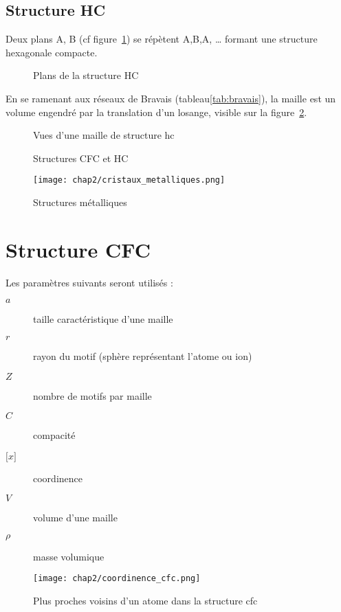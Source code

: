 \subsection{Structure HC}
Deux plans A, B (cf figure~\ref{fig:plan_ab_hc}) se répètent A,B,A, \dots
formant une structure hexagonale compacte.
\begin{figure}
    \centering
    \qquad
    \caption{Plans de la structure HC}\label{fig:plan_ab_hc}
\end{figure}
En se ramenant aux réseaux de Bravais (tableau\ref{tab:bravais}),
la maille est un volume engendré par la translation d'un losange,
visible sur la figure~\ref{fig:maille_hc}.
\begin{figure}
    \centering
    \qquad
    \caption{Vues d'une maille de structure hc}\label{fig:maille_hc}
\end{figure}

\begin{figure}
    \centering
    \qquad
    \caption{Structures CFC et HC}
\end{figure}
\begin{figure}
    \centering
    \texttt{[image: chap2/cristaux\_metalliques.png]}
    \caption{Structures métalliques}
\end{figure}


\section{Structure CFC}
Les paramètres suivants seront utilisés :
\begin{description}
    \item[$a$] taille caractéristique d'une maille
    \item[$r$] rayon du motif (sphère représentant l'atome ou ion)
    \item[$Z$] nombre de motifs par maille
    \item[$C$] compacité
    \item[$\lbrack x \rbrack$] coordinence
    \item[$V$] volume d'une maille
    \item[$\rho$] masse volumique
\end{description}
\begin{figure}
    \centering
    \texttt{[image: chap2/coordinence\_cfc.png]}
    \caption{Plus proches voisins d'un atome dans la
        structure cfc}\label{fig:coordinence_cfc}
\end{figure}
